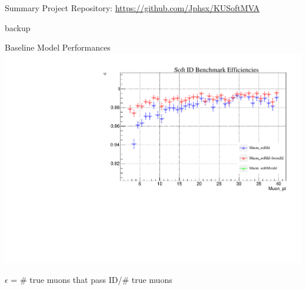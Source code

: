 \documentclass[10pt,handout]{beamer}
\begin{document}
\begin{frame}{Summary}
Project Repository: \url{https://github.com/Jphsx/KUSoftMVA}
\end{frame}

\begin{frame}{backup}
\end{frame}






\begin{frame}{Baseline Model Performances}
\includegraphics[scale=.5]{benchmarkEfficiency_TTjetszoomed.pdf}

$\epsilon$ = \# true muons that pass ID/\# true muons
\end{frame}
\end{document}
